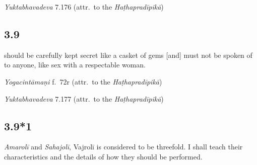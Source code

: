 \begin{ekdosis}
\begin{testimonia}[hp03_008]
\emph{Yuktabhavadeva} 7.176 (attr.~to the \emph{Haṭhapradīpikā})
\begin{versinnote}
\end{versinnote}
\end{testimonia}


\subsection*{3.9}
\begin{translation}[hp03_009]
[\ldots] should be carefully kept secret like a casket of gems [and] must not be spoken of to anyone, like sex with a respectable woman.
\end{translation}

\begin{sources}[hp03_009]
\end{sources}

\begin{testimonia}[hp03_009]
\emph{Yogacintāmaṇi} f.~72r (attr.~to the \emph{Haṭhapradīpikā})
\begin{versinnote}
\end{versinnote}

\emph{Yuktabhavadeva} 7.177 (attr.~to the \emph{Haṭhapradīpikā})
\begin{versinnote}
\end{versinnote}
\end{testimonia}


\subsection*{3.9*1}
\begin{translation}[hp03_009_1]
[With] \emph{Amarolī} and \emph{Sahajolī}, Vajrolī is considered to be threefold. I shall teach their characteristics and the details of how they should be performed.
\end{translation}


\end{ekdosis}
